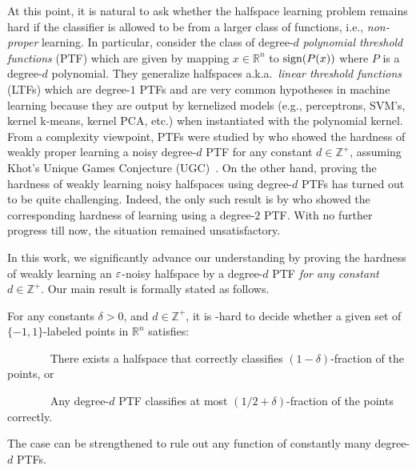 At this point, it is  natural to ask whether the halfspace learning problem remains hard
if the classifier is allowed to be from a larger class of functions, i.e., {\em non-proper} learning.
In particular, consider the class of degree-$d$ \emph{polynomial
threshold functions} (PTF) which are given by mapping $x \in
\mathbb{R}^n$ to $\textnormal{sign}(P(x))$ where $P$ is a degree-$d$ polynomial.
They generalize halfspaces a.k.a.~\emph{linear threshold functions}
(LTFs) which are degree-$1$ PTFs and are very common hypotheses in machine learning
because they are output by kernelized models (e.g., perceptrons, SVM's, kernel k-means, kernel PCA, etc.) when instantiated with the polynomial kernel. From a complexity viewpoint,
PTFs were studied by  \cite{DOSW11} who showed the hardness of weakly  proper 
learning a noisy degree-$d$ PTF for any constant $d \in
\mathbb{Z}^+$, assuming Khot's Unique Games Conjecture
(UGC)~\citep{Khot02}. On the other hand, proving the hardness of
weakly learning noisy halfspaces using degree-$d$ PTFs has turned out
to be quite challenging. Indeed, the only such result is by
\cite{DOSW11} who showed the corresponding hardness 
of learning using a degree-$2$ PTF. With no further
progress till now, the situation remained unsatisfactory. 

In this work, we significantly advance our understanding  by proving  the hardness 
of weakly learning an $\varepsilon$-noisy halfspace by a degree-$d$ PTF \emph{for any
constant} $d \in \mathbb{Z}^+$. Our main
result is formally stated as follows.

\begin{theorem}\label{thm:main} For any constants $\delta > 0$, and $d
\in \mathbb{Z}^+$, it is \NP-hard to decide whether a given
set of $\{-1,1\}$-labeled points in $\mathbb{R}^n$ satisfies:

\smallskip
\noindent
~~~~~~~ There exists a halfspace that correctly classifies
$(1-\delta)$-fraction of the points, or

\smallskip
\noindent
~~~~~~~ Any degree-$d$ PTF
classifies at most $(1/2+\delta)$-fraction of the points
correctly.

\smallskip
\noindent
The  case
 can be strengthened to rule out any function of constantly many
degree-$d$ PTFs.
\end{theorem}


